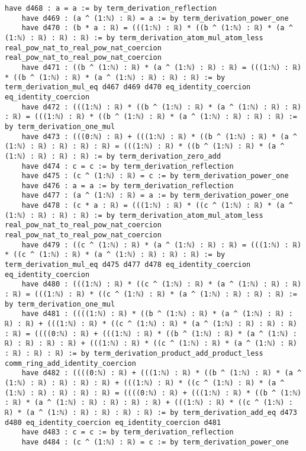 \documentclass{article}
\begin{document}
\begin{tcolorbox}[colback=white!10, width=\linewidth]
\begin{lstlisting}[language=Lean4]
    have d468 : a = a := by term_derivation_reflection
    have d469 : (a ^ (1:ℕ) : ℝ) = a := by term_derivation_power_one
    have d470 : (b * a : ℝ) = (((1:ℕ) : ℝ) * ((b ^ (1:ℕ) : ℝ) * (a ^ (1:ℕ) : ℝ) : ℝ) : ℝ) := by term_derivation_atom_mul_atom_less real_pow_nat_to_real_pow_nat_coercion real_pow_nat_to_real_pow_nat_coercion
    have d471 : ((b ^ (1:ℕ) : ℝ) * (a ^ (1:ℕ) : ℝ) : ℝ) = (((1:ℕ) : ℝ) * ((b ^ (1:ℕ) : ℝ) * (a ^ (1:ℕ) : ℝ) : ℝ) : ℝ) := by term_derivation_mul_eq d467 d469 d470 eq_identity_coercion eq_identity_coercion
    have d472 : (((1:ℕ) : ℝ) * ((b ^ (1:ℕ) : ℝ) * (a ^ (1:ℕ) : ℝ) : ℝ) : ℝ) = (((1:ℕ) : ℝ) * ((b ^ (1:ℕ) : ℝ) * (a ^ (1:ℕ) : ℝ) : ℝ) : ℝ) := by term_derivation_one_mul
    have d473 : (((0:ℕ) : ℝ) + (((1:ℕ) : ℝ) * ((b ^ (1:ℕ) : ℝ) * (a ^ (1:ℕ) : ℝ) : ℝ) : ℝ) : ℝ) = (((1:ℕ) : ℝ) * ((b ^ (1:ℕ) : ℝ) * (a ^ (1:ℕ) : ℝ) : ℝ) : ℝ) := by term_derivation_zero_add
    have d474 : c = c := by term_derivation_reflection
    have d475 : (c ^ (1:ℕ) : ℝ) = c := by term_derivation_power_one
    have d476 : a = a := by term_derivation_reflection
    have d477 : (a ^ (1:ℕ) : ℝ) = a := by term_derivation_power_one
    have d478 : (c * a : ℝ) = (((1:ℕ) : ℝ) * ((c ^ (1:ℕ) : ℝ) * (a ^ (1:ℕ) : ℝ) : ℝ) : ℝ) := by term_derivation_atom_mul_atom_less real_pow_nat_to_real_pow_nat_coercion real_pow_nat_to_real_pow_nat_coercion
    have d479 : ((c ^ (1:ℕ) : ℝ) * (a ^ (1:ℕ) : ℝ) : ℝ) = (((1:ℕ) : ℝ) * ((c ^ (1:ℕ) : ℝ) * (a ^ (1:ℕ) : ℝ) : ℝ) : ℝ) := by term_derivation_mul_eq d475 d477 d478 eq_identity_coercion eq_identity_coercion
    have d480 : (((1:ℕ) : ℝ) * ((c ^ (1:ℕ) : ℝ) * (a ^ (1:ℕ) : ℝ) : ℝ) : ℝ) = (((1:ℕ) : ℝ) * ((c ^ (1:ℕ) : ℝ) * (a ^ (1:ℕ) : ℝ) : ℝ) : ℝ) := by term_derivation_one_mul
    have d481 : ((((1:ℕ) : ℝ) * ((b ^ (1:ℕ) : ℝ) * (a ^ (1:ℕ) : ℝ) : ℝ) : ℝ) + (((1:ℕ) : ℝ) * ((c ^ (1:ℕ) : ℝ) * (a ^ (1:ℕ) : ℝ) : ℝ) : ℝ) : ℝ) = ((((0:ℕ) : ℝ) + (((1:ℕ) : ℝ) * ((b ^ (1:ℕ) : ℝ) * (a ^ (1:ℕ) : ℝ) : ℝ) : ℝ) : ℝ) + (((1:ℕ) : ℝ) * ((c ^ (1:ℕ) : ℝ) * (a ^ (1:ℕ) : ℝ) : ℝ) : ℝ) : ℝ) := by term_derivation_product_add_product_less comm_ring_add_identity_coercion
    have d482 : ((((0:ℕ) : ℝ) + (((1:ℕ) : ℝ) * ((b ^ (1:ℕ) : ℝ) * (a ^ (1:ℕ) : ℝ) : ℝ) : ℝ) : ℝ) + (((1:ℕ) : ℝ) * ((c ^ (1:ℕ) : ℝ) * (a ^ (1:ℕ) : ℝ) : ℝ) : ℝ) : ℝ) = ((((0:ℕ) : ℝ) + (((1:ℕ) : ℝ) * ((b ^ (1:ℕ) : ℝ) * (a ^ (1:ℕ) : ℝ) : ℝ) : ℝ) : ℝ) + (((1:ℕ) : ℝ) * ((c ^ (1:ℕ) : ℝ) * (a ^ (1:ℕ) : ℝ) : ℝ) : ℝ) : ℝ) := by term_derivation_add_eq d473 d480 eq_identity_coercion eq_identity_coercion d481
    have d483 : c = c := by term_derivation_reflection
    have d484 : (c ^ (1:ℕ) : ℝ) = c := by term_derivation_power_one

\end{lstlisting}
\end{tcolorbox}
\end{document}
